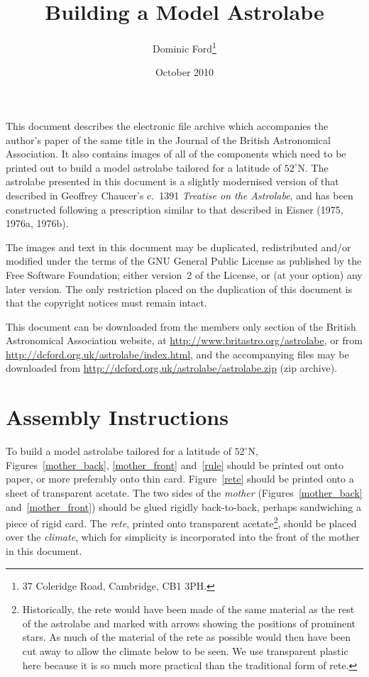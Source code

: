 \documentclass[a4paper,onecolumn,10pt]{article}
\title{Building a Model Astrolabe}
\author{Dominic Ford\footnote{37 Coleridge Road, Cambridge, CB1 3PH.}}
\date{October 2010}
\begin{document}
\maketitle
\setcounter{footnote}{1}

This document describes the electronic file archive which accompanies the
author's paper of the same title in the Journal of the British Astronomical
Association.  It also contains images of all of the components which need to be
printed out to build a model astrolabe tailored for a latitude of $52^\circ$N.
The astrolabe presented in this document is a slightly modernised version of
that described in Geoffrey Chaucer's c.\ 1391 {\it Treatise on the Astrolabe},
and has been constructed following a prescription similar to that described in
Eisner (1975, 1976a, 1976b).

The images and text in this document may be duplicated, redistributed and/or
modified under the terms of the GNU General Public License as published by the
Free Software Foundation; either version~2 of the License, or (at your option)
any later version. The only restriction placed on the duplication of this
document is that the copyright notices must remain intact.

This document can be downloaded from the members only section of the British
Astronomical Association website, at
\vspace{1mm}\newline\noindent
\url{http://www.britastro.org/astrolabe},
or from
\vspace{1mm}\newline\noindent
\url{http://dcford.org.uk/astrolabe/index.html},
\vspace{1mm}\newline\noindent
and the accompanying files may be downloaded from
\vspace{1mm}\newline\noindent
\url{http://dcford.org.uk/astrolabe/astrolabe.zip} (zip archive).

\section*{Assembly Instructions}

To build a model astrolabe tailored for a latitude of $52^\circ$N,
Figures~\ref{mother_back}, \ref{mother_front} and~\ref{rule} should be printed
out onto paper, or more preferably onto thin card.  Figure~\ref{rete} should be
printed onto a sheet of transparent acetate.  The two sides of the {\it mother}
(Figures~\ref{mother_back} and~\ref{mother_front}) should be glued rigidly
back-to-back, perhaps sandwiching a piece of rigid card. The {\it rete},
printed onto transparent acetate\footnote{Historically, the rete would have
been made of the same material as the rest of the astrolabe and marked with
arrows showing the positions of prominent stars. As much of the material of the
rete as possible would then have been cut away to allow the climate below to
be seen. We use transparent plastic here because it is so much more practical
than the traditional form of rete.}, should be placed over the {\it climate},
which for simplicity is incorporated into the front of the mother in this
document.
\end{document}
